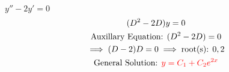 \item [10.] $y''-2y'=0$
\begin{gather*}
    (D^2-2D)y=0\\
    \text{Auxillary Equation: }(D^2-2D)=0\\
    \implies (D-2)D=0 \implies \text{root(s): }0,2\\
    \text{General Solution: } \textcolor{red}{y=C_1+C_2e^{2x}}
\end{gather*}